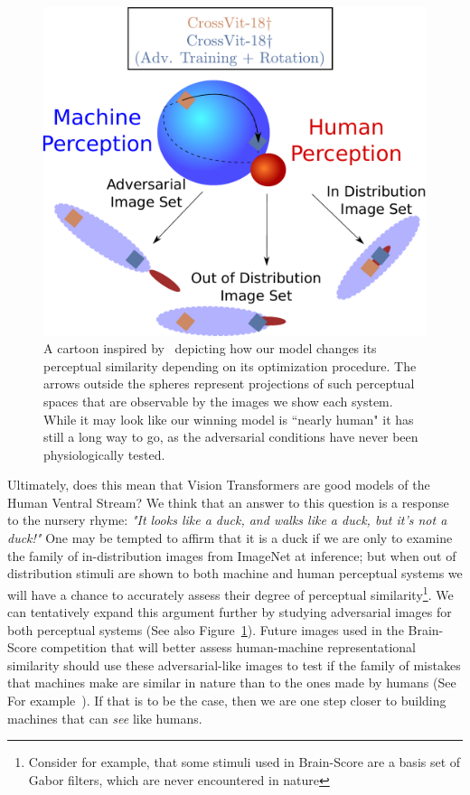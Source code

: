 \documentclass{article} %
\begin{document}
\begin{figure}
\centering
\vspace{-15pt}
\includegraphics[scale=0.3]{src/Discussion_Figure_Update.pdf}
\caption{A cartoon inspired by~\cite{feather2019metamers,feather2021adversarial} depicting how our model changes its perceptual similarity depending on its optimization procedure. The arrows outside the spheres represent projections of such perceptual spaces that are observable by the images we show each system. While it may look like our winning model is ``nearly human" it has still a long way to go, as the adversarial conditions have never been physiologically tested.}
\label{fig:Discussion}
\end{figure}Ultimately, does this mean that Vision Transformers are good models of the Human Ventral Stream? We think that an answer to this question is a response to the nursery rhyme: \textit{"It looks like a duck, and walks like a duck, but it's not a duck!"} One may be tempted to affirm that it is a duck if we are only to examine the family of in-distribution images from ImageNet at inference; but when out of distribution stimuli are shown to both machine and human perceptual systems we will have a chance to accurately assess their degree of perceptual similarity\footnote{Consider for example, that some stimuli used in Brain-Score are a basis set of Gabor filters, which are never encountered in nature}. We can tentatively expand this argument further by studying adversarial images for both perceptual systems (See also Figure~\ref{fig:Discussion}). Future images used in the Brain-Score competition that will better assess human-machine representational similarity should use these adversarial-like images to test if the family of mistakes that machines make are similar in nature than to the ones made by humans (See For example~\cite{doi:10.1073/pnas.1912334117}). If that is to be the case, then we are one step closer to building machines that can \textit{see} like humans.
\end{document}
